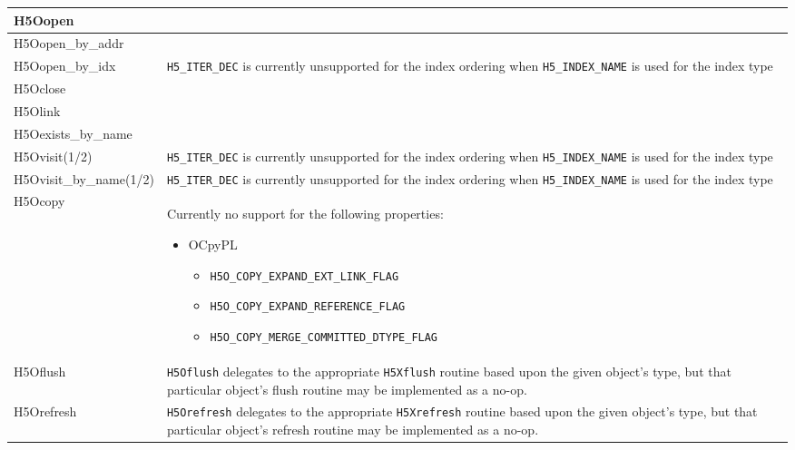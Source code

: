 \documentclass[../users_guide.tex]{subfiles}
\begin{document}
\begin{center}
\begin{tabularx}{\linewidth}{| X | >{\RaggedRight}X |}
H5Oopen & \\ \hline
H5Oopen\_by\_addr & \\ \hline
H5Oopen\_by\_idx & \texttt{H5\_ITER\_DEC} is currently unsupported for the index ordering when \texttt{H5\_INDEX\_NAME} is used for the index type\\ \hline
H5Oclose & \\ \hline
H5Olink & \\ \hline
H5Oexists\_by\_name & \\ \hline
H5Ovisit(1/2) & \texttt{H5\_ITER\_DEC} is currently unsupported for the index ordering when \texttt{H5\_INDEX\_NAME} is used for the index type\\ \hline
H5Ovisit\_by\_name(1/2) & \texttt{H5\_ITER\_DEC} is currently unsupported for the index ordering when \texttt{H5\_INDEX\_NAME} is used for the index type\\ \hline
H5Ocopy & Currently no support for the following properties: \begin{itemize}
                                                                 \setlength{\itemindent}{-1em}
                                                                 \item OCpyPL
                                                                 \begin{itemize}
                                                                     \setlength{\itemindent}{-2.5em}
                                                                     \item {\small\texttt{H5O\_COPY\_EXPAND\_EXT\_LINK\_FLAG}}\footnotemark[2]
                                                                     \item {\small\texttt{H5O\_COPY\_EXPAND\_REFERENCE\_FLAG}}\footnotemark[1]
                                                                     \item {\small\texttt{H5O\_COPY\_MERGE\_COMMITTED\_DTYPE\_FLAG}}
                                                                 \end{itemize}
                                                             \end{itemize}\\ \hline
H5Oflush & \texttt{H5Oflush} delegates to the appropriate \texttt{H5Xflush} routine based upon the given object's type, but that particular object's flush routine may be implemented as a no-op. \\ \hline
H5Orefresh & \texttt{H5Orefresh} delegates to the appropriate \texttt{H5Xrefresh} routine based upon the given object's type, but that particular object's refresh routine may be implemented as a no-op. \\ \hline


\end{tabularx}
\end{center}
\end{document}

